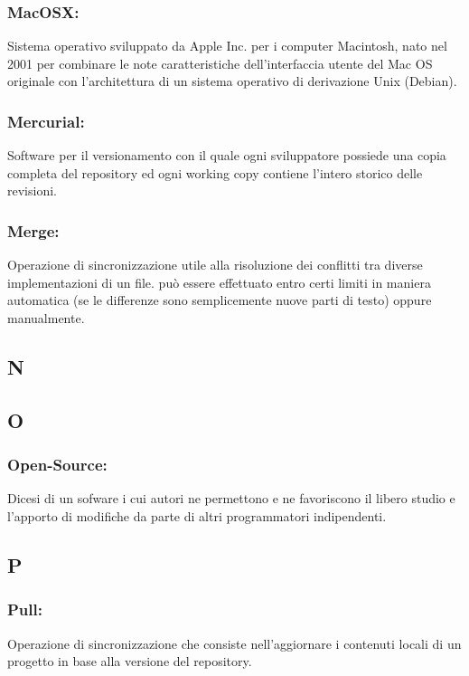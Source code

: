 \subsubsection*{MacOSX:} Sistema operativo sviluppato da Apple Inc. per i
computer Macintosh, nato nel 2001 per combinare le note caratteristiche
dell'interfaccia utente del Mac OS originale con l'architettura di un sistema
operativo di derivazione Unix (Debian).

\subsubsection*{Mercurial:} Software per il versionamento con il quale ogni
sviluppatore possiede una copia completa del repository ed ogni working copy
contiene l'intero storico delle revisioni.

\subsubsection*{Merge:} Operazione di sincronizzazione utile alla risoluzione
dei conflitti tra diverse implementazioni di un file. pu\`o essere effettuato
entro certi limiti in maniera automatica (se le differenze sono semplicemente
nuove parti di testo) oppure manualmente.

\subsection*{\huge{N}}

\subsection*{\huge{O}}
\subsubsection*{Open-Source:} Dicesi di un sofware i cui autori ne permettono e
ne favoriscono il libero studio e l'apporto di modifiche da parte di altri programmatori indipendenti.
\subsection*{\huge{P}}

\subsubsection*{Pull:} Operazione di sincronizzazione che consiste
nell'aggiornare i contenuti locali di un progetto in base alla versione del repository.

